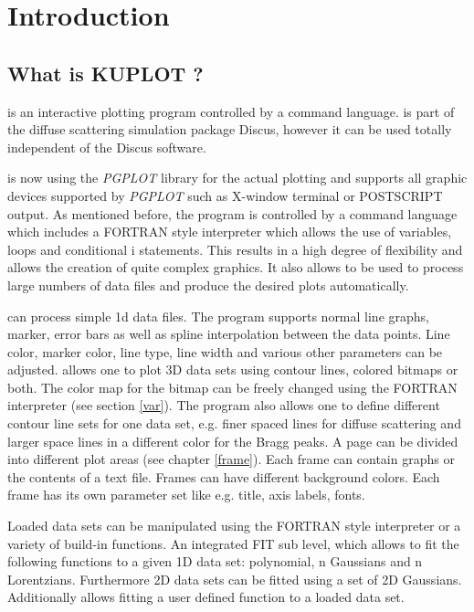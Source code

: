 
\chapter{Introduction}
\section{What is KUPLOT ?}

\Kuplot is an interactive plotting program controlled by a
command language.  \Kuplot is part of the diffuse scattering
simulation package {\sc Discus}, however it can be used totally
independent of the {\sc Discus} software.  \par

\Kuplot is now using the {\it PGPLOT} library for the actual
plotting and supports all graphic devices supported by {\it
PGPLOT} such as X-window terminal or POSTSCRIPT output. As
mentioned before, the program is controlled by a command language
which includes a FORTRAN style interpreter which allows the use of
variables, loops and conditional i statements. This results in a
high degree of flexibility and allows the creation of quite
complex graphics. It also allows \Kuplot to be used to
process large numbers of data files and produce the desired plots
automatically. \par

\Kuplot can process simple 1d data files.  The program
supports normal line graphs, marker, error bars as well as spline
interpolation between the data points.  Line color, marker color,
line type, line width and various other parameters can be
adjusted.  \Kuplot allows one to plot 3D data sets using
contour lines, colored bitmaps or both.  The color map for the
bitmap can be freely changed using the FORTRAN interpreter (see
section \ref{var}).  The program also allows one to define
different contour line sets for one data set, e.g.  finer spaced
lines for diffuse scattering and larger space lines in a different
color for the Bragg peaks. A page can be divided into different
plot areas (see chapter \ref{frame}). Each frame can contain
graphs or the contents of a text file.  Frames can have different
background colors.  Each frame has its own parameter set like e.g.
title, axis labels, fonts.  \par

Loaded data sets can be manipulated using the FORTRAN style
interpreter or a variety of build-in functions.  An integrated FIT
sub level, which allows to fit the following functions to a given
1D data set: polynomial, n Gaussians and n Lorentzians.
Furthermore 2D data sets can be fitted using a set of 2D
Gaussians. Additionally \Kuplot allows fitting a user defined
function to a loaded data set.

